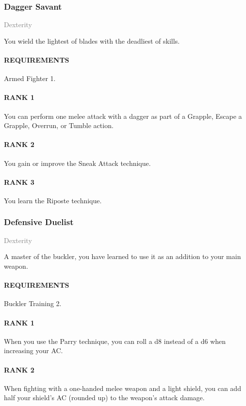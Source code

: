 \subsubsection{Dagger Savant} \label{feat::daggersavant}
\small{\textcolor{gray}{Dexterity}}

\normalsize
You wield the lightest of blades with the deadliest of skills.
\paragraph{REQUIREMENTS} Armed Fighter 1.
\paragraph{RANK 1} You can perform one melee attack with a dagger as part of a Grapple, Escape a Grapple, Overrun, or Tumble action.
\paragraph{RANK 2} You gain or improve the Sneak Attack technique.
\paragraph{RANK 3} You learn the Riposte technique.

\subsubsection{Defensive Duelist} \label{feat::defensiveduelist}
\small{\textcolor{gray}{Dexterity}}

\normalsize
A master of the buckler, you have learned to use it as an addition to your main weapon.
\paragraph{REQUIREMENTS} Buckler Training 2.
\paragraph{RANK 1} When you use the Parry technique, you can roll a d8 instead of a d6 when increasing your AC.
\paragraph{RANK 2} When fighting with a one-handed melee weapon and a light shield, you can add half your shield's AC (rounded up) to the weapon's attack damage.
